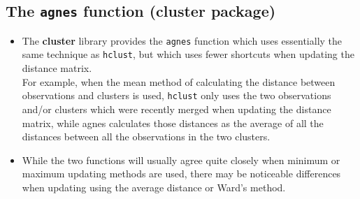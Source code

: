 \documentclass[RCluster.tex]{subfiles}
\begin{document}
\subsection{The \texttt{agnes} function (cluster package)}
\begin{itemize}
\item The \textbf{cluster} library provides the \texttt{agnes} function which uses essentially the same technique as \texttt{hclust}, but which uses fewer shortcuts when updating the distance matrix.\\ For example, when the mean method of calculating the distance between observations and clusters is used, \texttt{hclust} only uses the two observations and/or clusters which were recently merged when updating the distance matrix, while agnes calculates those distances as the average of all the distances between all the observations in the two clusters. 

\item While the two functions will usually agree quite closely when minimum or maximum updating methods are used, there may be noticeable differences when updating using the average distance or Ward's method.
\end{itemize}
\newpage

\newpage
\end{document}
